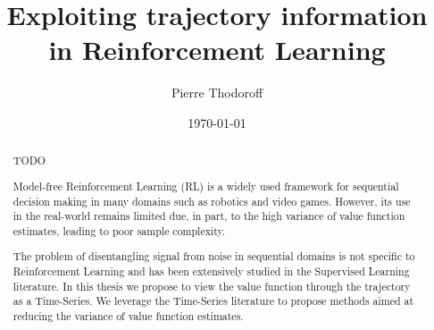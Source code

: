 \documentclass[12pt, oneside, extrafontsizes]{memoir}
\begin{document}

\pretitle{\begin{center}\cftchapterfont\huge}
\posttitle{\end{center}}
\preauthor{\begin{center}\huge}
\postauthor{\end{center}}
\predate{\begin{center}\large}
\postdate{\end{center}}

\title{Exploiting trajectory information in Reinforcement Learning}
\author{Pierre Thodoroff}
\date{\today}
\renewcommand\maketitlehookb{
\vfill
}
\renewcommand\maketitlehookc{
\vfill
\begin{center}
{
\large
Computer Science\\
McGill University, Montreal
}
\end{center}
\vspace{10mm}
}
\renewcommand\maketitlehookd{
\vspace{10mm}
A thesis submitted to McGill University in partial fulfilment of the requirements of
the degree of Master of Science.
\copyright Pierre Thodoroff; \today.
}

\begin{titlingpage}
\maketitle
\end{titlingpage}


\clearpage
{}
\renewcommand{\abstractname}{Acknowledgements}
\begin{abstract}
TODO
\end{abstract}

\clearpage
\renewcommand{\abstractname}{Abstract}
\begin{abstract}
Model-free Reinforcement Learning (RL) is a widely used framework for sequential decision making in many domains such as robotics and video games. However, its use in the real-world remains limited due, in part, to the high variance of value function estimates, leading to poor sample complexity. 

The problem of disentangling signal from noise in sequential domains is not specific to Reinforcement Learning and has been extensively studied in the Supervised Learning literature. In this thesis we propose to view the value function through the trajectory as a Time-Series. We leverage the Time-Series literature to propose methods aimed at reducing the variance of value function estimates. 
\end{abstract}
\end{document}
